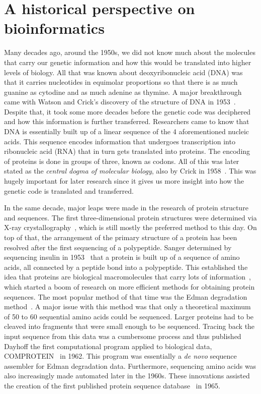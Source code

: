 \section{A historical perspective on bioinformatics}
Many decades ago, around the 1950s, we did not know much about the molecules that carry our genetic information and how this would be translated into higher levels of biology. All that was known about deoxyribonucleic acid (DNA) was that it carries nucleotides in equimolar proportions so that there is as much guanine as cytodine and as much adenine as thymine. A major breakthrough came with Watson and Crick's discovery of the structure of DNA in 1953~\cite{dnastruct}. Despite that, it took some more decades before the genetic code was deciphered and how this information is further transferred. Researchers came to know that DNA is essentially built up of a linear sequence of the 4 aforementioned nucleic acids. This sequence encodes information that undergoes transcription into ribonucleic acid (RNA) that in turn gets translated into proteins. The encoding of proteins is done in groups of three, known as codons. All of this was later stated as the \textit{central dogma of molecular biology}, also by Crick in 1958~\cite{dogma}. This was hugely important for later research since it gives us more insight into how the genetic code is translated and transferred.

In the same decade, major leaps were made in the research of protein structure and sequences. The first three-dimensional protein structures were determined via X-ray crystallography~\cite{xray}, which is still mostly the preferred method to this day. On top of that, the arrangement of the primary structure of a protein has been resolved after the first sequencing of a polypeptide. Sanger determined by sequencing insulin in 1953~\cite{insulin} that a protein is built up of a sequence of amino acids, all connected by a peptide bond into a polypeptide. This established the idea that proteins are biological macromolecules that carry lots of information~\cite{primstruct}, which started a boom of research on more efficient methods for obtaining protein sequences. The most popular method of that time was the Edman degradation method~\cite{edman}. A major issue with this method was that only a theoretical maximum of 50 to 60 sequential amino acids could be sequenced. Larger proteins had to be cleaved into fragments that were small enough to be sequenced. Tracing back the input sequence from this data was a cumbersome process and thus published Dayhoff the first computational program applied to biological data, COMPROTEIN~\cite{comprotein} in 1962. This program was essentially a \textit{de novo} sequence assembler for Edman degradation data. Furthermore, sequencing amino acids was also increasingly made automated later in the 1960s. These innovations assisted the creation of the first published protein sequence database~\cite{atlas} in 1965.

